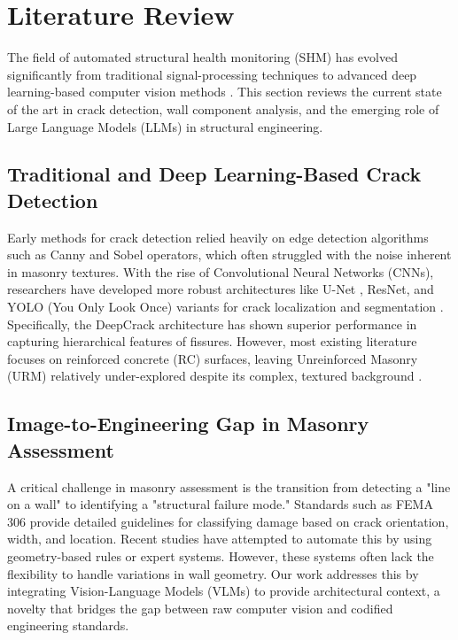 \section{Literature Review}
\label{sec:literature_review}

\begin{sloppypar}
The field of automated structural health monitoring (SHM) has evolved significantly from traditional signal-processing techniques to advanced deep learning-based computer vision methods \cite{koch2015review, mohan2018crack}. This section reviews the current state of the art in crack detection, wall component analysis, and the emerging role of Large Language Models (LLMs) in structural engineering.
\end{sloppypar}

\subsection{Traditional and Deep Learning-Based Crack Detection}
\begin{sloppypar}
Early methods for crack detection relied heavily on edge detection algorithms such as Canny and Sobel operators, which often struggled with the noise inherent in masonry textures. With the rise of Convolutional Neural Networks (CNNs), researchers have developed more robust architectures like U-Net \cite{ronneberger2015u}, ResNet, and YOLO (You Only Look Once) variants for crack localization and segmentation \cite{yolov8}. Specifically, the DeepCrack architecture \cite{liu2019deepcrack} has shown superior performance in capturing hierarchical features of fissures. However, most existing literature focuses on reinforced concrete (RC) surfaces, leaving Unreinforced Masonry (URM) relatively under-explored despite its complex, textured background \cite{bhowmick2020automated}.
\end{sloppypar}

\subsection{Image-to-Engineering Gap in Masonry Assessment}
\begin{sloppypar}
A critical challenge in masonry assessment is the transition from detecting a "line on a wall" to identifying a "structural failure mode." Standards such as FEMA 306 \cite{fema306} provide detailed guidelines for classifying damage based on crack orientation, width, and location. Recent studies have attempted to automate this by using geometry-based rules or expert systems. However, these systems often lack the flexibility to handle variations in wall geometry. Our work addresses this by integrating Vision-Language Models (VLMs) to provide architectural context, a novelty that bridges the gap between raw computer vision and codified engineering standards.
\end{sloppypar}

